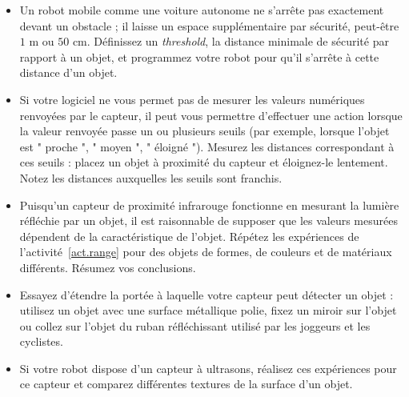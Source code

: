 \medskip

\begin{framed}

\begin{itemize}
\item Un robot mobile comme une voiture autonome ne s'arrête pas exactement devant un obstacle ; il laisse un espace supplémentaire par sécurité, peut-être $1$ m ou $50$ cm. Définissez un \emph{threshold}, la distance minimale de sécurité par rapport à un objet, et programmez votre robot pour qu'il s'arrête à cette distance d'un objet.
\item Si votre logiciel ne vous permet pas de mesurer les valeurs numériques renvoyées par le capteur, il peut vous permettre d'effectuer une action lorsque la valeur renvoyée passe un ou plusieurs seuils (par exemple, lorsque l'objet est " proche ", " moyen ", " éloigné "). Mesurez les distances correspondant à ces seuils : placez un objet à proximité du capteur et éloignez-le lentement. Notez les distances auxquelles les seuils sont franchis.
\end{itemize}
\end{framed}

\begin{framed}

\begin{itemize}
\item Puisqu'un capteur de proximité infrarouge fonctionne en mesurant la lumière réfléchie par un objet, il est raisonnable de supposer que les valeurs mesurées dépendent de la caractéristique de l'objet. Répétez les expériences de l'activité~\ref{act.range} pour des objets de formes, de couleurs et de matériaux différents. Résumez vos conclusions.
\item Essayez d'étendre la portée à laquelle votre capteur peut détecter un objet : utilisez un objet avec une surface métallique polie, fixez un miroir sur l'objet ou collez sur l'objet du ruban réfléchissant utilisé par les joggeurs et les cyclistes.
\item Si votre robot dispose d'un capteur à ultrasons, réalisez ces expériences pour ce capteur et comparez différentes textures de la surface d'un objet.
\end{itemize}
\end{framed}


